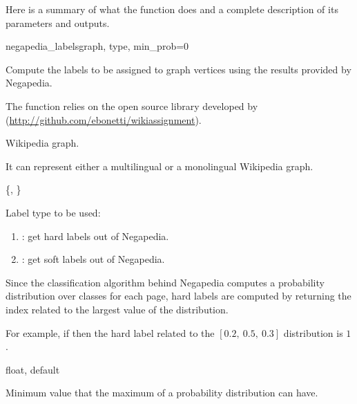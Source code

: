             Here is a summary of what the function does and a complete description of its parameters and outputs.
            \begin{independentfunctiondoc}{negapedia\_labels}{graph, type, min\_prob=0}
                \begin{functiondescription}
                    Compute the labels to be assigned to graph vertices using the results provided by Negapedia.
                    
                    The function relies on the open source library  developed by \citeauthor{Bonetti} (\url{http://github.com/ebonetti/wikiassignment}).
                \end{functiondescription}
                
                \begin{functionparameters}
                    \item[graph] 
                    
                    Wikipedia graph.
                    
                    It can represent either a multilingual or a monolingual Wikipedia graph.
                    \item[type] \{, \}
                    
                    Label type to be used:
                    \begin{enumerate}
                        \item {}: get hard labels out of Negapedia.
                        \item {}: get soft labels out of Negapedia.
                    \end{enumerate}
                    
                    Since the classification algorithm behind Negapedia computes a probability distribution over classes for each page, hard labels are computed by returning the index related to the largest value of the distribution.
                    
                    For example, if  then the hard label related to the \(\left[0.2,\ 0.5,\ 0.3\right]\) distribution is \(1\).
                    \item[min\_prob] float, default 
                    
                    Minimum value that the maximum of a probability distribution can have.
                    

\end{functionparameters}
\end{independentfunctiondoc}
